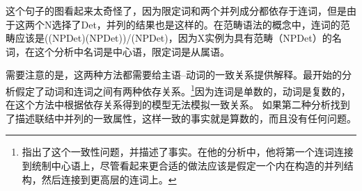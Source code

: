 这个句子的图看起来太奇怪了，因为限定词和两个并列成分都依存于连词，但是由于这两个N选择了Det，并列的结果也是这样的。在范畴语法的概念中，连词的范畴应该是((NP\bs Det)\bs (NP\bs Det))/(NP\bs Det)，因为X实例为具有范畴（NP\bs Det）的名词，在这个分析中名词是中心语，限定词是从属语。

需要注意的是，这两种方法都需要给主语--动词的一致关系提供解释。\tes 最开始的分析假定了动词和连词之间有两种依存关系。\footnote{%
 \citet[]{Eroms2000a}指出了这个一致性问题，并描述了事实。在他的分析中，他将第一个连词连接到统制中心语上，尽管看起来更合适的做法应该是假定一个内在构造的并列结构，然后连接到更高层的连词上。
}因为连词是单数的，动词是复数的，在这个方法中根据依存关系得到的模型无法模拟一致关系。
如果第二种分析找到了描述联结中并列的一致属性，这样一致的事实就是算数的，而且没有任何问题。

